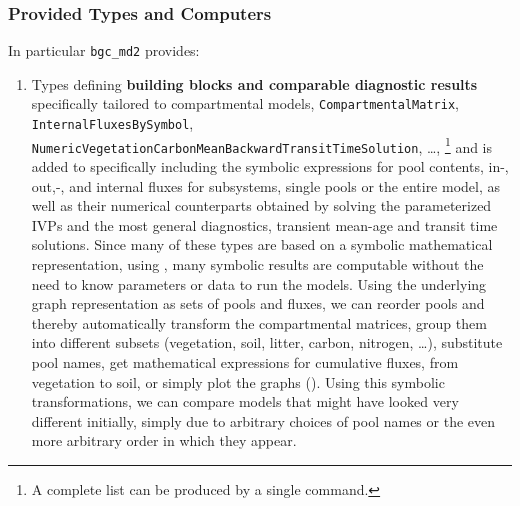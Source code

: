 \subsubsection{Provided Types and Computers}
In particular \texttt{bgc\_md2} provides:
  \begin{enumerate}
    \item
      Types defining {\bf building blocks and comparable diagnostic results} 
      specifically tailored to compartmental models, 
      \eg \texttt{CompartmentalMatrix}, \texttt{InternalFluxesBySymbol},
      \texttt{NumericVegetationCarbonMeanBackwardTransitTimeSolution}, \dots,  
      \footnote{A complete list can be produced by a single command. }
  and is added to 
      specifically including the symbolic expressions for pool contents, in-, out,-, and internal fluxes for
      subsystems, single pools or the entire model, as well as their numerical counterparts obtained 
      by solving the parameterized IVPs  and the most general diagnostics, \eg transient mean-age and transit time solutions. 
      Since many of these types are based on a symbolic
      mathematical representation, using \sympy{}, many symbolic results are computable 
      without the need to know parameters or data to run the
      models.  Using the underlying graph representation as sets
      of pools and fluxes, we can reorder pools and thereby
      automatically transform the compartmental matrices, group
      them into different subsets (\eg vegetation, soil, litter,
      carbon, nitrogen, \dots), substitute pool names, get
      mathematical expressions for cumulative fluxes, \eg from
      vegetation to soil, or simply plot the graphs ().
      Using this symbolic transformations, we can compare models that might
      have looked very different initially, simply due to
      arbitrary choices of pool names or the even more arbitrary
      order in which they appear. 
      \begin{figure}[h]

\end{figure}
\end{enumerate}
